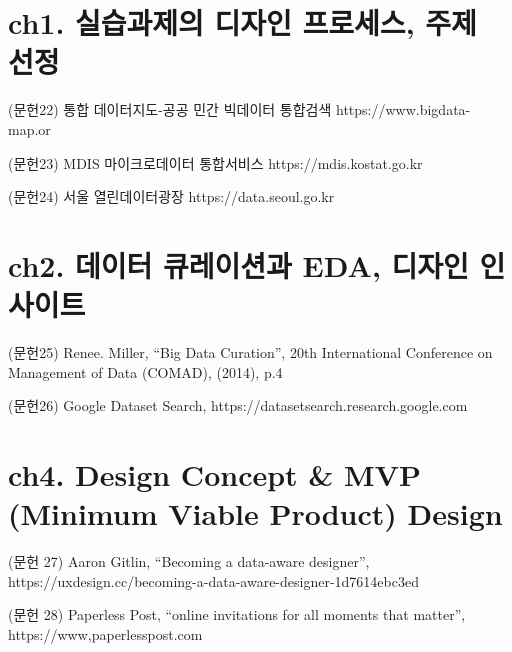 \documentclass[
  letterpaper,
]{book}
\begin{document}

\section*{ch1. 실습과제의 디자인 프로세스, 주제
선정}\label{ch1.-uxc2e4uxc2b5uxacfcuxc81cuxc758-uxb514uxc790uxc778-uxd504uxb85cuxc138uxc2a4-uxc8fcuxc81c-uxc120uxc815-1}


(문헌22) 통합 데이터지도-공공 민간 빅데이터 통합검색
https://www.bigdata-map.or

(문헌23) MDIS 마이크로데이터 통합서비스 https://mdis.kostat.go.kr

(문헌24) 서울 열린데이터광장 https://data.seoul.go.kr

\section*{ch2. 데이터 큐레이션과 EDA, 디자인
인사이트}\label{ch2.-uxb370uxc774uxd130-uxd050uxb808uxc774uxc158uxacfc-eda-uxb514uxc790uxc778-uxc778uxc0acuxc774uxd2b8-1}


(문헌25) Renee. Miller, ``Big Data Curation'', 20th International
Conference on Management of Data (COMAD), (2014), p.4

(문헌26) Google Dataset Search,
https://datasetsearch.research.google.com

\section*{ch4. Design Concept \& MVP (Minimum Viable Product)
Design}\label{ch4.-design-concept-mvp-minimum-viable-product-design}


(문헌 27) Aaron Gitlin, ``Becoming a data-aware designer'',
https://uxdesign.cc/becoming-a-data-aware-designer-1d7614ebc3ed

(문헌 28) Paperless Post, ``online invitations for all moments that
matter'', https://www,paperlesspost.com
\end{document}
